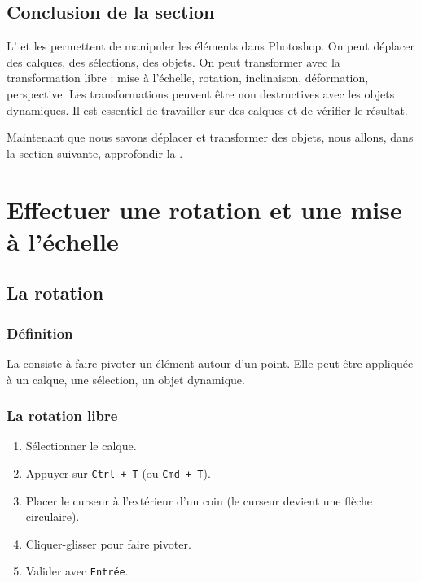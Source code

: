 \subsection*{Conclusion de la section}

L' et les  permettent de manipuler les éléments dans Photoshop. On peut déplacer des calques, des sélections, des objets. On peut transformer avec la transformation libre : mise à l'échelle, rotation, inclinaison, déformation, perspective. Les transformations peuvent être non destructives avec les objets dynamiques. Il est essentiel de travailler sur des calques et de vérifier le résultat.

Maintenant que nous savons déplacer et transformer des objets, nous allons, dans la section suivante, approfondir la .

\section{Effectuer une rotation et une mise à l'échelle}

\subsection{La rotation}

\subsubsection{Définition}

La  consiste à faire pivoter un élément autour d'un point. Elle peut être appliquée à un calque, une sélection, un objet dynamique.

\subsubsection{La rotation libre}

\begin{enumerate}
    \item Sélectionner le calque.
    \item Appuyer sur \texttt{Ctrl + T} (ou \texttt{Cmd + T}).
    \item Placer le curseur à l'extérieur d'un coin (le curseur devient une flèche circulaire).
    \item Cliquer-glisser pour faire pivoter.
    \item Valider avec \texttt{Entrée}.
\end{enumerate}

